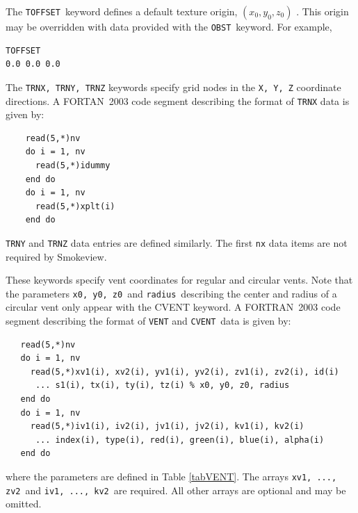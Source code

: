 \documentclass[11pt,twoside]{book}
\newcommand{\hitem}[1]{\item[{\bf #1} \hfill]}
\begin{document}
\hitem{TOFFSET}The {\tt TOFFSET}\ keyword defines a default texture origin, $(x_0, y_0, z_0)$ .
This origin may be overridden with data provided with the {\tt OBST}\ keyword. For example,

\begin{lstlisting}
TOFFSET
0.0 0.0 0.0
\end{lstlisting}

\hitem{TRNX,TRNY,TRNZ}The {\tt TRNX, TRNY, TRNZ} keywords specify
grid nodes in the {\tt X, Y, Z} coordinate directions.  A
FORTAN~2003 code segment describing the format of {\tt TRNX} data
is given by:
\begin{lstlisting}
    read(5,*)nv
    do i = 1, nv
      read(5,*)idummy
    end do
    do i = 1, nv
      read(5,*)xplt(i)
    end do
\end{lstlisting}
{\tt TRNY} and {\tt TRNZ} data entries are defined similarly. The
first {\tt nx} data items are not required by Smokeview.

\hitem{VENT, CVENT}These keywords specify vent coordinates for regular and circular vents.
Note that the parameters {\tt x0, y0, z0}\ and {\tt radius}\ describing the center and radius
of a circular vent
only appear with the CVENT keyword.
A FORTRAN~2003
code segment describing the format of {\tt VENT} and {\tt CVENT}\ data is given by:
\begin{lstlisting}
   read(5,*)nv
   do i = 1, nv
     read(5,*)xv1(i), xv2(i), yv1(i), yv2(i), zv1(i), zv2(i), id(i)
      ... s1(i), tx(i), ty(i), tz(i) % x0, y0, z0, radius
   end do
   do i = 1, nv
     read(5,*)iv1(i), iv2(i), jv1(i), jv2(i), kv1(i), kv2(i)
      ... index(i), type(i), red(i), green(i), blue(i), alpha(i)
   end do
\end{lstlisting}
where the parameters are defined in Table \ref{tabVENT}.
The arrays {\tt xv1,  ..., zv2}\ and {\tt iv1, ..., kv2}\ are
required. All other arrays are optional and may be omitted.
\end{document}
